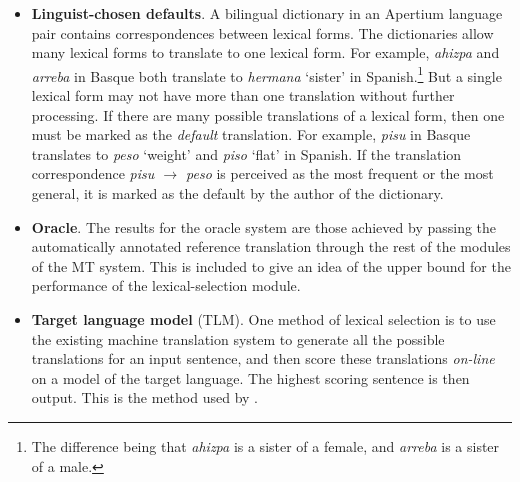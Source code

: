 \documentclass[11pt]{article}
\newcommand{\comment}[1]{\todo{#1}}
\begin{document}
\begin{itemize}
\addtolength{\itemsep}{-0.05in}
\item \textbf{Linguist-chosen defaults}. 
  A bilingual dictionary in an
  Apertium language pair contains correspondences between lexical
  forms. The dictionaries allow many lexical forms to translate to one
  lexical form. For example, \emph{ahizpa} and \emph{arreba} in Basque
  both translate to \emph{hermana} `sister' in Spanish.\footnote{The
    difference being that \emph{ahizpa} is a sister of a female, and
    \emph{arreba} is a sister of a male.} But a single lexical form
  may not have more than one translation without further
  processing. If there are many possible translations of a lexical
  form, then one must be marked as the \emph{default} translation. For
  example, \emph{pisu} in Basque translates to \emph{peso} `weight'
  and \emph{piso} `flat' in Spanish. If the translation correspondence
  \emph{pisu $\rightarrow$ peso} is perceived as the most frequent or
  the most general, it is marked as the default by the author of the dictionary. %

\item \textbf{Oracle}.  The results for the oracle system are those
  achieved by passing the automatically annotated reference
  translation through the rest of the modules of the MT system. This
  is included to give an idea of the upper bound for the performance
  of the lexical-selection module. %

\item \textbf{Target language model} (TLM). One method of lexical
  selection is to use the existing machine translation system to
  generate all the possible translations for an input sentence, and
  then score these translations \emph{on-line} on a model of the
  target language. The highest scoring sentence is then 
  output. This is the method used by %
  \cite{melero07a}.  
\end{itemize}
\end{document}
